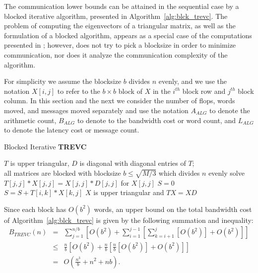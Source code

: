 \documentclass{article}
\def\lt{\left}
\def\rt{\right}
\theoremstyle{definition}
\begin{document}
The communication lower bounds can be attained in the sequential case by a blocked iterative algorithm, presented in Algorithm~\ref{alg:blck_trevc}. The problem of computing the eigenvectors of a triangular matrix, as well as the formulation of a blocked algorithm, appears as a special case of the computations presented in \cite{Henry95}; however,  \cite{Henry95} does not try to pick a blocksize in order to minimize communication, nor does it analyze the communication complexity of the algorithm.

 For simplicity we assume the blocksize $b$ divides $n$ evenly, and we use the notation $X[i,j]$ to refer to the $b\times b$ block of $X$ in the $i^{th}$ block row and $j^{th}$ block column.  In this section and the next we consider the number of flops, words moved, and messages moved separately and use the notation $A_{ALG}$ to denote the arithmetic count, $B_{ALG}$ to denote to the bandwidth cost or word count, and $L_{ALG}$ to denote the latency cost or message count.  

\begin{algorithm}
\protect\caption{Blocked Iterative {\bf TREVC}}
\label{alg:blck_trevc}
\begin{algorithmic}[1]
\REQUIRE $T$ is upper triangular, $D$ is diagonal with diagonal entries of $T$; \\
	all matrices are blocked with blocksize $b\leq \sqrt{M/3}$ which divides $n$ evenly
	\STATE solve $T[j,j]*X[j,j] = X[j,j]*D[j,j]$ for $X[j,j]$
		\STATE $S = 0$
			\STATE $S = S + T[i,k]*X[k,j]$
		\ENDFOR
	\ENDFOR
\ENDFOR
\ENSURE $X$ is upper triangular and $TX=XD$
\end{algorithmic}
\end{algorithm}

Since each block has $O(b^2)$ words, an upper bound on the total bandwidth cost of Algorithm~\ref{alg:blck_trevc} is given by the following summation and inequality:
\begin{eqnarray*}
B_{TREVC}(n) &=& \sum_{j=1}^{n/b} \lt[ O(b^2) + \sum_{i=1}^{j-1} \lt[ \sum_{k=i+1}^j \lt[ O(b^2) \rt] + O(b^2) \rt] \rt] \\
 &\leq& \frac nb \lt[ O(b^2) + \frac nb \lt[ \frac nb \lt[ O(b^2) \rt] + O(b^2) \rt] \rt] \\
 &=& O\lt( \frac{n^3}{b} + n^2 + nb \rt).
 \end{eqnarray*}
\end{document}
